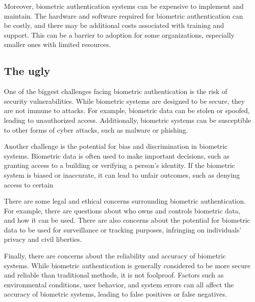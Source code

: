 Moreover, biometric authentication systems can be expensive to implement and maintain.
The hardware and software required for biometric authentication can be costly, and
there may be additional costs associated with training and support. This can be a
barrier to adoption for some organizations, especially smaller ones with limited
resources.

\subsection{The ugly}

\hspace{1 em} One of the biggest challenges facing biometric authentication is 
the risk of security vulnerabilities. While biometric systems are designed to be
secure, they are not immune to attacks. For example, biometric data can be stolen
or spoofed, leading to unauthorized access. Additionally, biometric systems can
be susceptible to other forms of cyber attacks, such as malware or phishing.

Another challenge is the potential for bias and discrimination in biometric systems.
Biometric data is often used to make important decisions, such as granting access
to a building or verifying a person's identity. If the biometric system is biased
or inaccurate, it can lead to unfair outcomes, such as denying access to certain

There are some legal and ethical concerns surrounding biometric authentication.
For example, there are questions about who owns and controls biometric data, and
how it can be used. There are also concerns about the potential for biometric data
to be used for surveillance or tracking purposes, infringing on individuals' privacy
and civil liberties.

Finally, there are concerns about the reliability and accuracy of biometric systems.
While biometric authentication is generally considered to be more secure and reliable
than traditional methods, it is not foolproof. Factors such as environmental conditions,
user behavior, and system errors can all affect the accuracy of biometric systems,
leading to false positives or false negatives.

\hspace{1 em} 